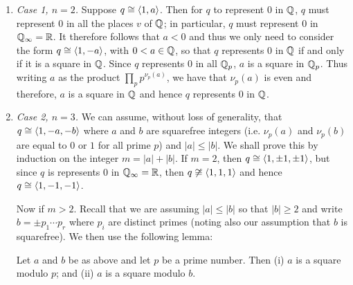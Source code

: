 \begin{enumerate}[wide, nosep, label=(\alph*)]
    \item \emph{Case 1, \(n = 2\).} Suppose \(q \cong \langle 1, a \rangle\). Then for \(q\) to represent \(0\) in \(\mathbb{Q}\), \(q\) must represent \(0\) in all the places \(v\) of \(\mathbb{Q}\); in particular, \(q\) must represent \(0\) in \(\mathbb{Q}_{\infty} = \mathbb{R}\). It therefore follows that \(a < 0\) and thus we only need to consider the form \(q \cong \langle 1, -a \rangle\), with \(0 < a \in \mathbb{Q}\), so that \(q\) represents \(0\) in \(\mathbb{Q}\) if and only if it is a square in \(\mathbb{Q}\). Since \(q\) represents \(0\) in all \(\mathbb{Q}_p\),  \(a\) is a square in \(\mathbb{Q}_p\). Thus writing \(a\) as the product \(\prod_p p^{\nu_p(a)}\), we have that \(\nu_p(a)\) is even and therefore, \(a\) is a square in \(\mathbb{Q}\) and hence \(q\) represents \(0\) in \(\mathbb{Q}\).
    
    \item \emph{Case 2, \(n = 3\).} We can assume, without loss of generality, that \(q \cong \langle 1, -a, -b \rangle\) where \(a\) and \(b\) are squarefree integers (i.e. \(\nu_p(a)\) and \(\nu_p(b)\) are equal to \(0\) or \(1\) for all prime \(p\)) and \(|a| \leq |b|\). We shall prove this by induction on the integer \(m = |a| + |b|\). If \(m = 2\), then \(q \cong \langle 1, \pm 1, \pm 1 \rangle\), but since \(q\) is represents 0 in \(\mathbb{Q}_\infty = \mathbb{R}\), then \(q \not\cong \langle 1, 1, 1 \rangle\) and hence \(q \cong \langle 1, -1, -1 \rangle\).
    
    Now if \(m > 2\). Recall that we are assuming \(|a| \leq |b|\) so that \(|b| \geq 2\) and write \(b = \pm p_1 \cdots p_r\) where \(p_i\) are distinct primes (noting also our assumption that \(b\) is squarefree). We then use the following lemma:

    \begin{lemma}
        Let \(a\) and \(b\) be as above and let \(p\) be a prime number. Then {\normalfont (i)} \(a\) is a square modulo \(p\); and {\normalfont (ii)} \(a\) is a square modulo \(b\).
    \end{lemma}


\end{enumerate}
